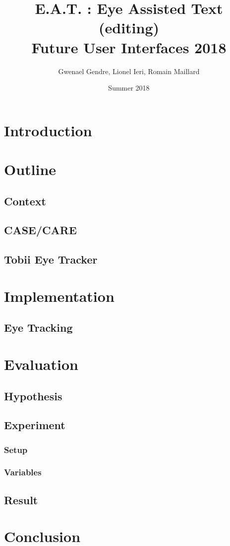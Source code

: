 \documentclass[12pt, a4paper]{article}
\title{%
\large{\textbf{E.A.T. : Eye Assisted Text (editing)}}\\
Future User Interfaces 2018}
\author{Gwenael Gendre, Lionel Ieri, Romain Maillard}
\date{Summer 2018}
\begin{document}
 
\begin{titlepage}
\maketitle
\end{titlepage}
\tableofcontents
\newpage

\section{Introduction}

\section{Outline}
\subsection{Context}

\subsection{CASE/CARE}

\subsection{Tobii Eye Tracker}

\section{Implementation}
\subsection{Eye Tracking}

\section{Evaluation}
\subsection{Hypothesis}

\subsection{Experiment}
\subsubsection{Setup}
\subsubsection{Variables}

\subsection{Result}

\section{Conclusion}
 
\end{document}
